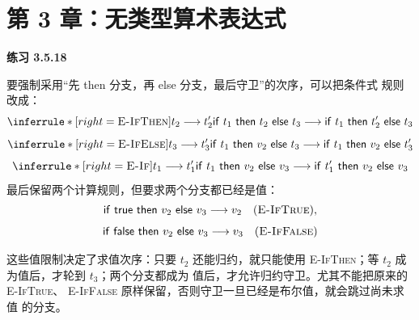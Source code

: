 \section*{第 3 章：无类型算术表达式}

\begin{taplsolutionentrybox}
\label{sol:translator:3.5.18}
\textbf{练习 3.5.18}

要强制采用“先 then 分支，再 else 分支，最后守卫”的次序，可以把条件式
规则改成：
\[
\inferrule*[right=\textsc{E-IfThen}]
  {t_2\trans t_2'}
  {\taplif{t_1}{t_2}{t_3}
   \trans
   \taplif{t_1}{t_2'}{t_3}}
\]
\[
\inferrule*[right=\textsc{E-IfElse}]
  {t_3\trans t_3'}
  {\taplif{t_1}{v_2}{t_3}
   \trans
   \taplif{t_1}{v_2}{t_3'}}
\]
\[
\inferrule*[right=\textsc{E-If}]
  {t_1\trans t_1'}
  {\taplif{t_1}{v_2}{v_3}
   \trans
   \taplif{t_1'}{v_2}{v_3}}
\]
最后保留两个计算规则，但要求两个分支都已经是值：
\[
\begin{gathered}
  \mathsf{if}\ \mathsf{true}\ \mathsf{then}\ v_2\ \mathsf{else}\ v_3\mathrel{\longrightarrow} v_2
  \quad(\textsc{E-IfTrue}),\\[4pt]
  \mathsf{if}\ \mathsf{false}\ \mathsf{then}\ v_2\ \mathsf{else}\ v_3\mathrel{\longrightarrow} v_3
  \quad(\textsc{E-IfFalse})
\end{gathered}
\]

这些值限制决定了求值次序：只要 \(t_2\) 还能归约，就只能使用
\textsc{E-IfThen}；等 \(t_2\) 成为值后，才轮到 \(t_3\)；两个分支都成为
值后，才允许归约守卫。尤其不能把原来的 \textsc{E-IfTrue}、
\textsc{E-IfFalse} 原样保留，否则守卫一旦已经是布尔值，就会跳过尚未求值
的分支。

\end{taplsolutionentrybox}
